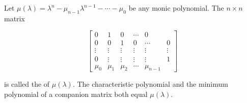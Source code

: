 Let $\mu(\lambda) = \lambda^n - \mu_{n-1}\lambda^{n-1} - \cdots - \mu_0$ be any monic polynomial. The $n \times n$ matrix

$$\begin{bmatrix}
0 & 1 & 0 & \cdots & 0 \\
0 & 0 & 1 & 0 & \cdots & 0 \\
\vdots & \vdots & \vdots & \vdots & \vdots & \vdots \\
0 & \vdots & \vdots & \vdots & \vdots & 1 \\
\mu_0 & \mu_1 & \mu_2 & \cdots & \mu_{n-1}
\end{bmatrix}$$

is called the  of $\mu(\lambda)$. The characteristic polynomial and the minimum polynomial of a companion matrix both equal $\mu(\lambda)$.
